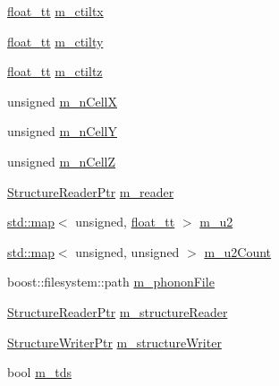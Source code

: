 \begin{DoxyCompactItemize}
\item 
\hyperlink{namespace_q_s_t_e_m_a915d7caa497280d9f927c4ce8d330e47}{float\-\_\-tt} \hyperlink{class_q_s_t_e_m_1_1_c_crystal_af568c40cce598288e027f2ee676adc15}{m\-\_\-ctiltx}
\item 
\hyperlink{namespace_q_s_t_e_m_a915d7caa497280d9f927c4ce8d330e47}{float\-\_\-tt} \hyperlink{class_q_s_t_e_m_1_1_c_crystal_a11778a698f15c21b1f834383289db2b1}{m\-\_\-ctilty}
\item 
\hyperlink{namespace_q_s_t_e_m_a915d7caa497280d9f927c4ce8d330e47}{float\-\_\-tt} \hyperlink{class_q_s_t_e_m_1_1_c_crystal_ad5dae178ec539fbc2b97d7f399bde619}{m\-\_\-ctiltz}
\item 
unsigned \hyperlink{class_q_s_t_e_m_1_1_c_crystal_a7b8f359287cd61eef0dcd170c4e09585}{m\-\_\-n\-Cell\-X}
\item 
unsigned \hyperlink{class_q_s_t_e_m_1_1_c_crystal_a468ef22a3bc97734eede8356daef701e}{m\-\_\-n\-Cell\-Y}
\item 
unsigned \hyperlink{class_q_s_t_e_m_1_1_c_crystal_a047bad8b5c71632c8227ae1e927a3be5}{m\-\_\-n\-Cell\-Z}
\item 
\hyperlink{namespace_q_s_t_e_m_a3496fb9b2de0f3b3350f9b0d5206bc75}{Structure\-Reader\-Ptr} \hyperlink{class_q_s_t_e_m_1_1_c_crystal_a31f0c0f7a7aa072c11530663515dfe68}{m\-\_\-reader}
\item 
\hyperlink{_displacement_params_8m_af619c74fd72bdb64d115463dff2720cd}{std\-::map}$<$ unsigned, \hyperlink{namespace_q_s_t_e_m_a915d7caa497280d9f927c4ce8d330e47}{float\-\_\-tt} $>$ \hyperlink{class_q_s_t_e_m_1_1_c_crystal_a880590aa8c6ee5b7da1b6b31069b6751}{m\-\_\-u2}
\item 
\hyperlink{_displacement_params_8m_af619c74fd72bdb64d115463dff2720cd}{std\-::map}$<$ unsigned, unsigned $>$ \hyperlink{class_q_s_t_e_m_1_1_c_crystal_a320ae1aadd9aed66f4efd1ba46a4ce65}{m\-\_\-u2\-Count}
\item 
boost\-::filesystem\-::path \hyperlink{class_q_s_t_e_m_1_1_c_crystal_a9b936fcf70d65b7be30bc0c3297d0d78}{m\-\_\-phonon\-File}
\item 
\hyperlink{namespace_q_s_t_e_m_a3496fb9b2de0f3b3350f9b0d5206bc75}{Structure\-Reader\-Ptr} \hyperlink{class_q_s_t_e_m_1_1_c_crystal_ae4fc5007296cb4116827ec927b1454f7}{m\-\_\-structure\-Reader}
\item 
\hyperlink{namespace_q_s_t_e_m_abd9ebd39703fa5559b437aa35900ef5c}{Structure\-Writer\-Ptr} \hyperlink{class_q_s_t_e_m_1_1_c_crystal_a002d361cc0cf2df32145b4f47bc1548c}{m\-\_\-structure\-Writer}
\item 
bool \hyperlink{class_q_s_t_e_m_1_1_c_crystal_a6e6f76b2a4627cc786c2ecfd4589b72b}{m\-\_\-tds}

\end{DoxyCompactItemize}
